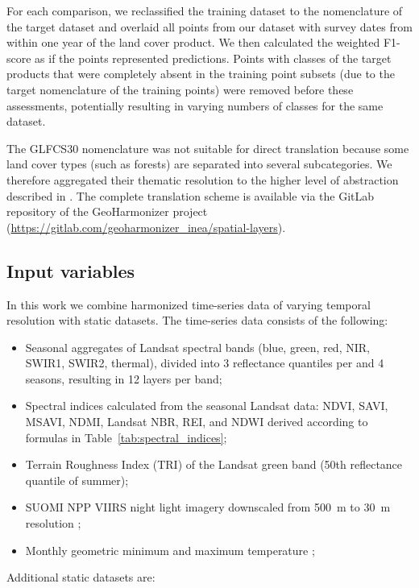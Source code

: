     For each comparison, we reclassified the training dataset to the nomenclature of the target dataset and overlaid all points from our dataset with survey dates from within one year of the land cover product. We then calculated the weighted F1-score as if the points represented predictions. Points with classes of the target products that were completely absent in the training point subsets (due to the target nomenclature of the training points) were removed before these assessments, potentially resulting in varying numbers of classes for the same dataset. 
    
    The GLFCS30 nomenclature was not suitable for direct translation because some land cover types (such as forests) are separated into several subcategories. We therefore aggregated their thematic resolution to the higher level of abstraction described in \citet{zhang2020glcfcs30}. The complete translation scheme is available via the GitLab repository of the GeoHarmonizer project (\url{https://gitlab.com/geoharmonizer_inea/spatial-layers}).

\subsection*{Input variables}
    
    In this work we combine harmonized time-series data of varying temporal resolution with static datasets. The time-series data consists of the following:
    
    \begin{itemize}
    \item Seasonal aggregates of Landsat spectral bands (blue, green, red, NIR, SWIR1, SWIR2, thermal), divided into 3 reflectance quantiles per and 4 seasons, resulting in 12 layers per band;
    \item Spectral indices calculated from the seasonal Landsat data: NDVI, SAVI, MSAVI, NDMI, Landsat NBR, REI, and NDWI derived according to formulas in Table\@~\ref{tab:spectral_indices};
    \item Terrain Roughness Index (TRI) of the Landsat green band (50th reflectance quantile of summer);
    \item SUOMI NPP VIIRS night light imagery downscaled from 500~m to 30~m resolution \citep{hillger2013first};
    \item Monthly geometric minimum and maximum temperature \citep{kilibarda2014spatio};
    \end{itemize}
    
    Additional static datasets are:
    

